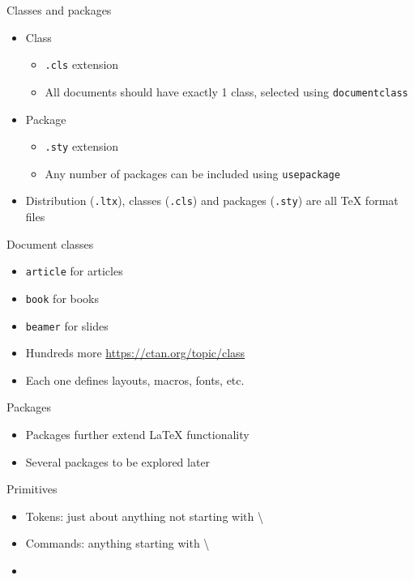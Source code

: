 \documentclass[english]{beamer}
\let\olditem\item
\renewcommand{\item}{\setlength{\itemsep}{\fill}\olditem}
\newenvironment{sitemize}{\let\item\olditem \begin{itemize}}{\vfill\end{itemize}}
\let\textttt\texttt
\renewcommand{\texttt}[1]{\colorbox{gray!10}{\textttt{#1}}}
\begin{document}
\begin{frame}{Classes and packages}
    \begin{itemize}
        \item Class
        \begin{sitemize}
            \item \texttt{.cls} extension
            \item All documents should have exactly 1 class, selected using \texttt{documentclass}
        \end{sitemize}
        
        \item Package
        \begin{sitemize}
            \item \texttt{.sty} extension
            \item Any number of packages can be included using \texttt{usepackage}
        \end{sitemize}
        
        \item Distribution (\texttt{.ltx}), classes (\texttt{.cls}) and packages (\texttt{.sty}) are all \TeX{} format files
    \end{itemize}
\end{frame}

\begin{frame}{Document classes}
    \begin{itemize}
        \item \texttt{article} for articles
        \item \texttt{book} for books
        \item \texttt{beamer} for slides
        \item Hundreds more \url{https://ctan.org/topic/class}
        \item Each one defines layouts, macros, fonts, etc.
    \end{itemize}
\end{frame}

\begin{frame}{Packages}
    \begin{itemize}
        \item Packages further extend \LaTeX{} functionality
        \item Several packages to be explored later
    \end{itemize}
\end{frame}

\begin{frame}[fragile]{Primitives}
    \begin{itemize}
        \item Tokens: just about anything not starting with \textbackslash{}
        \item Commands: anything starting with \textbackslash{}
        
        \item \hyperlink{sld_charcodes}{}
    \end{itemize}
\end{frame}
\end{document}
